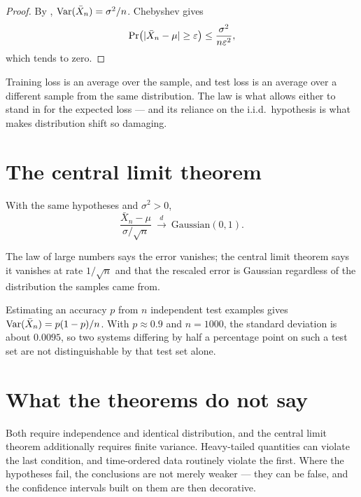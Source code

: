 \begin{proof}
By , \(\operatorname{Var}(\bar X_n)=\sigma^{2}/n\). Chebyshev gives
\[
	\operatorname{Pr}\bigl(|\bar X_n-\mu|\ge\varepsilon\bigr)\le\frac{\sigma^{2}}{n\varepsilon^{2}},
\]
which tends to zero.
\end{proof}

\begin{remark}
Training loss is an average over the sample, and test loss is an average over a
different sample from the same distribution. The law is what allows either to
stand in for the expected loss --- and its reliance on the i.i.d.\ hypothesis is
what makes distribution shift so damaging.
\end{remark}

\section{The central limit theorem}

\begin{theorem}
With the same hypotheses and \(\sigma^{2}>0\),
\[
	\frac{\bar X_n-\mu}{\sigma/\sqrt n}
	\ \xrightarrow{\ d\ }\ \text{Gaussian}(0,1).
\]
\end{theorem}

The law of large numbers says the error vanishes; the central limit theorem says
it vanishes at rate \(1/\sqrt n\) and that the rescaled error is Gaussian
regardless of the distribution the samples came from.


\begin{example}
Estimating an accuracy \(p\) from \(n\) independent test examples gives
\(\operatorname{Var}(\bar X_n)=p(1-p)/n\). With \(p\approx0.9\) and \(n=1000\), the standard
deviation is about \(0.0095\), so two systems differing by half a percentage
point on such a test set are not distinguishable by that test set alone.
\end{example}

\section{What the theorems do not say}

Both require independence and identical distribution, and the central limit
theorem additionally requires finite variance. Heavy-tailed quantities can
violate the last condition, and time-ordered data routinely violate the first.
Where the hypotheses fail, the conclusions are not merely weaker --- they can be
false, and the confidence intervals built on them are then decorative.
